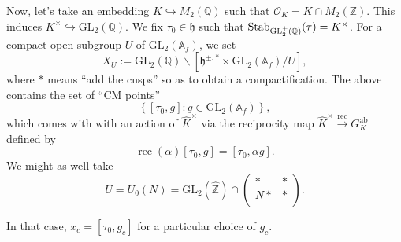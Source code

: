 \documentclass[reqno]{amsart} 
\begin{document}
Now, let's take an embedding $K \hookrightarrow M_2(\mathbb{Q})$ such that $\mathcal{O}_K = K \cap M_2(\mathbb{Z})$.  This induces $K^\times \hookrightarrow \mathrm{GL}_2(\mathbb{Q})$.  We fix $\tau_0 \in \mathfrak{h}$ such that $\operatorname{Stab}_{\mathrm{GL}_2^+(\mathbb{Q})}(\tau) = K^\times$.  For a compact open subgroup $U$ of $\mathrm{GL}_2(\mathbb{A}_f)$, we set
\begin{equation*}
  X_U := \mathrm{GL}_2(\mathbb{Q}) \backslash[\mathfrak{h}^{\pm, \ast} \times \mathrm{GL}_2(\mathbb{A}_f) / U],
\end{equation*}
where $\ast$ means ``add the cusps'' so as to obtain a compactification.    The above contains the set of ``CM points''
\begin{equation*}
  \left\{[\tau_0, g] : g \in \mathrm{GL}_2(\mathbb{A}_f) \right\},
\end{equation*}
which comes with with an action of $\hat{K}^\times$ via the reciprocity map $\hat{K}^\times \xrightarrow{\mathrm{rec}} G_K^{\mathrm{ab}}$ defined by
\begin{equation*}
  \operatorname{rec}(\alpha)[\tau_0, g]
  =[\tau_0, \alpha g].
\end{equation*}
We might as well take
\begin{equation*}
  U = U_0(N) = \mathrm{GL}_2(\hat{\mathbb{Z}}) \cap
  \begin{pmatrix}
    \ast    & \ast \\
    N \ast            &  \ast \\
  \end{pmatrix}.
\end{equation*}

In that case, $x_c =[\tau_0, g_c]$ for a particular choice of $g_c$.
\end{document}
